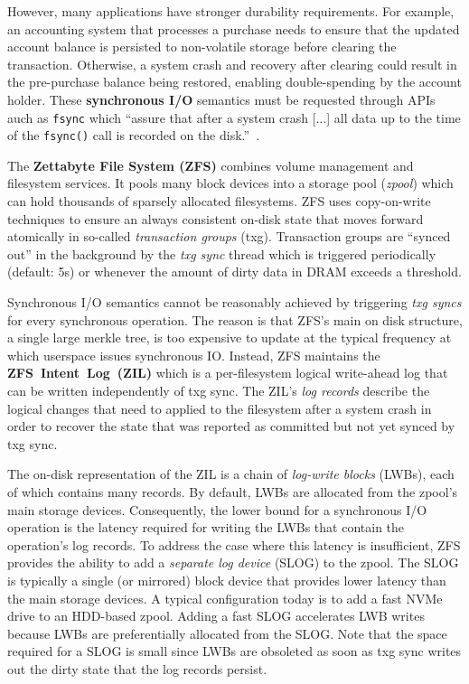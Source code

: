 \documentclass[12pt,a4paper,twoside]{book}
\begin{document}
However, many applications have stronger durability requirements.
For example, an accounting system that processes a purchase needs to ensure that the updated account balance is persisted to non-volatile storage before clearing the transaction.
Otherwise, a system crash and recovery after clearing could result in the pre-purchase balance being restored, enabling double-spending by the account holder.
These \textbf{synchronous I/O} semantics must be requested through APIs auch as \lstinline{fsync} which ``assure that after a system crash [...] all data up to the time of the \lstinline{fsync()} call is recorded on the disk.''~\cite{OpenGroupFsync}.

The \textbf{Zettabyte File System (ZFS)} combines volume management and filesystem services.
It pools many block devices into a storage pool (\textit{zpool}) which can hold thousands of sparsely allocated filesystems.
ZFS uses copy-on-write techniques to ensure an always consistent on-disk state that moves forward atomically in so-called \textit{transaction groups} (txg).
Transaction groups are ``synced out'' in the background by the \textit{txg sync} thread which is triggered periodically (default: 5s) or whenever the amount of dirty data in DRAM exceeds a threshold.

Synchronous I/O semantics cannot be reasonably achieved by triggering \textit{txg syncs} for every synchronous operation.
The reason is that ZFS's main on disk structure, a single large merkle tree, is too expensive to update at the typical frequency at which userspace issues synchronous IO.
Instead, ZFS maintains the \mbox{\textbf{ZFS Intent Log (ZIL)}} which is a per-filesystem logical write-ahead log that can be written independently of txg sync.
The ZIL's \textit{log records} describe the logical changes that need to applied to the filesystem after a system crash in order to recover the state that was reported as committed but not yet synced by txg sync.

The on-disk representation of the ZIL is a chain of \textit{log-write blocks} (LWBs), each of which contains many records.
By default, LWBs are allocated from the zpool's main storage devices.
Consequently, the lower bound for a synchronous I/O operation is the latency required for writing the LWBs that contain the operation's log records.
To address the case where this latency is insufficient, ZFS provides the ability to add a \textit{separate log device} (SLOG) to the zpool.
The SLOG is typically a single (or mirrored) block device that provides lower latency than the main storage devices.
A typical configuration today is to add a fast NVMe drive to an HDD-based zpool.
Adding a fast SLOG accelerates LWB writes because LWBs are preferentially allocated from the SLOG.
Note that the space required for a SLOG is small since LWBs are obsoleted as soon as txg sync writes out the dirty state that the log records persist.
\end{document}
